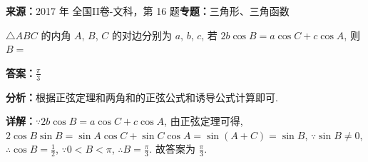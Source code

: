 \begin{question}[points=5]
\textbf{来源：}2017 年 全国II卷-文科，第 16 题\quad \textbf{专题：}三角形、三角函数\par
$\triangle ABC$ 的内角 $A$, $B$, $C$ 的对边分别为 $a$, $b$, $c$, 若 $2b\cos B=a\cos C+c\cos A$, 则 $B=$
\fillin[{$\frac{\pi}{3}$}]
\begin{solution}
\textbf{答案：}$\frac{\pi}{3}$

\textbf{分析：}根据正弦定理和两角和的正弦公式和诱导公式计算即可.

\textbf{详解：}$\because 2b\cos B=a\cos C+c\cos A$, 由正弦定理可得, $2\cos B\sin B=\sin A\cos C+\sin C\cos A=\sin(A+C)=\sin B$, $\because \sin B\neq0$, $\therefore \cos B=\frac{1}{2}$, $\because 0<B<\pi$, $\therefore B=\frac{\pi}{3}$. 故答案为 $\frac{\pi}{3}$.
\end{solution}
\end{question}

